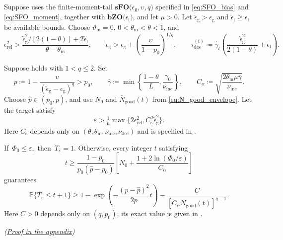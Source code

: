 \documentclass{article}
\begin{document}
\begin{assumption}
\label{ass:mu_pos_sfo_bzo}
Suppose  uses the finite-moment-tail \(\textbf{sFO(}\epsilon_{\mathrm g},\upsilon,q\textbf{)}\) specified in \eqref{eq:SFO_bias} and \eqref{eq:SFO_moment}, together with \(\textbf{bZO(}\epsilon_{\mathrm f}\textbf{)}\), and let \(\mu>0\). Let
\(\widetilde\epsilon_{\mathrm{g}}>\epsilon_{\mathrm{g}}\) and
\(\widetilde\epsilon_{\mathrm{f}}\ge\epsilon_{\mathrm{f}}\) be available bounds. Choose
\(\vartheta_{\mathrm{m}}=0\), \(0<\theta_{\mathrm{m}}<\theta<1\), and
\begin{equation}\label{eq:tolerances_mu_sfo}
\epsilon_{\mathrm{rel}}^2>
\frac{\widetilde\epsilon_{\mathrm{g}}^2/[2(1-\theta)]+2\widetilde\epsilon_{\mathrm{f}}}
{\theta-\theta_{\mathrm{m}}},\qquad
\widetilde\epsilon_{\mathrm{g}}>
\epsilon_{\mathrm{g}}+\left(\frac{\upsilon}{1-p_0}\right)^{1/q},\qquad
\tau_{\mathrm{des}}^{(t)}\coloneqq \hat\gamma_t
\left(\frac{\widetilde\epsilon_{\mathrm{g}}^2}{2(1-\theta)}
+\widetilde\epsilon_{\mathrm{f}}\right).
\end{equation}
\end{assumption}

\begin{theorem}
\label{thm:mu_pos_sfo_bzo}
Suppose  holds with \(1<q\le2\). Set
\[
p\coloneqq 1-\frac{\upsilon}{(\widetilde\epsilon_{\mathrm{g}}-\epsilon_{\mathrm{g}})^q}>p_0,
\qquad
\bar\gamma\coloneqq\min\left\{\frac{1-\theta}{L},\frac{\gamma_0}{\nu_{\mathrm{inc}}}\right\},
\qquad
C_\alpha\coloneqq\sqrt{\frac{2\theta_{\mathrm{m}}\mu\bar\gamma}{\nu_{\mathrm{inc}}}}.
\]
Choose \(\hat p\in(p_0,p)\), and use \(N_0\) and
\(\bar N_{\mathrm{good}}(t)\) from \eqref{eq:N_good_envelope}.
Let the target satisfy
\begin{equation}\label{eq:precision_mu_sfo}
\varepsilon>\tfrac{1}{\mu}
\max\{2\epsilon_{\mathrm{rel}}^2,
C_{\mathrm{s}}^2\widetilde\epsilon_{\mathrm{g}}^2\}.
\end{equation}
Here \(C_{\mathrm{s}}\) depends only on
\((\theta,\theta_{\mathrm{m}},\nu_{\mathrm{inc}},\nu_{\mathrm{dec}})\)
and is specified in .

\mbox{If \(\Phi_0\le\varepsilon\), then \(T_\varepsilon=1\).} Otherwise, every integer \(t\) satisfying
\begingroup{}
\begin{equation}\label{eq:complexity_mu_sfo}
t\ge
\frac{1-p_0}{p_0(\hat p-p_0)}
\left[N_0+\frac{1+2\ln(\Phi_0/\varepsilon)}{C_\alpha}\right]
\end{equation}
guarantees
\begin{equation}\label{eq:probability_mu_sfo}
\mathbb P\{T_\varepsilon\le t+1\}
\ge1-\exp\!\left(-\frac{(p-\hat p)^2}{2p}t\right)
-\frac{C}{[C_\alpha\bar N_{\mathrm{good}}(t)]^{q-1}}.
\end{equation}
Here \(C>0\) depends only on \((q,p_0)\); its exact value is given in
.
\par\nobreak\hfill\textnormal{\small\itshape(\hyperref[proof:mu_pos_sfo_bzo]{Proof in the appendix})}\par
\endgroup
\end{theorem}
\end{document}
